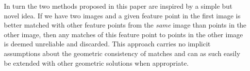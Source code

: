 \documentclass[12pt,journal,compsoc]{IEEEtran}
\begin{document}
In turn the two methods proposed in this paper are inspired by a simple 
but novel idea. If we have two images and a given feature point in the 
first image is better matched with other feature points from the 
\emph{same} image than points in the other image, then any matches of 
this feature point to points in the other image is deemed unreliable and 
discarded.  This approach carries no implicit assumptions about the 
geometric consistency of matches and can as such easily be extended with 
other geometric solutions when appropriate.
%
\end{document}
